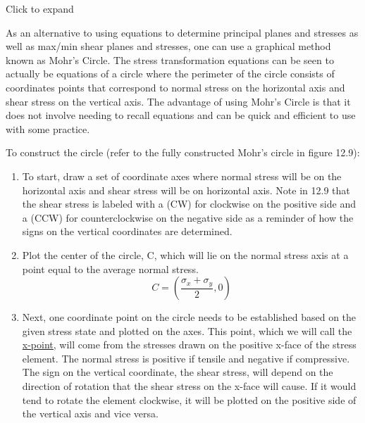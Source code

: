 \documentclass[
  letterpaper,
  DIV=11,
  numbers=noendperiod]{scrreprt}
\begin{document}
Click to expand

As an alternative to using equations to determine principal planes and
stresses as well as max/min shear planes and stresses, one can use a
graphical method known as Mohr's Circle. The stress transformation
equations can be seen to actually be equations of a circle where the
perimeter of the circle consists of coordinates points that correspond
to normal stress on the horizontal axis and shear stress on the vertical
axis. The advantage of using Mohr's Circle is that it does not involve
needing to recall equations and can be quick and efficient to use with
some practice.

To construct the circle (refer to the fully constructed Mohr's circle in
figure 12.9):

\begin{enumerate}
\def\labelenumi{\arabic{enumi}.}
\item
  To start, draw a set of coordinate axes where normal stress will be on
  the horizontal axis and shear stress will be on horizontal axis. Note
  in 12.9 that the shear stress is labeled with a (CW) for clockwise on
  the positive side and a (CCW) for counterclockwise on the negative
  side as a reminder of how the signs on the vertical coordinates are
  determined.
\item
  Plot the center of the circle, C, which will lie on the normal stress
  axis at a point equal to the average normal stress.\\
  \[
  C=\left(\frac{\sigma_x+\sigma_y}{2}, 0\right)
  \]
\item
  Next, one coordinate point on the circle needs to be established based
  on the given stress state and plotted on the axes. This point, which
  we will call the \ul{x-point,} will come from the stresses drawn on
  the positive x-face of the stress element. The normal stress is
  positive if tensile and negative if compressive. The sign on the
  vertical coordinate, the shear stress, will depend on the direction of
  rotation that the shear stress on the x-face will cause. If it would
  tend to rotate the element clockwise, it will be plotted on the
  positive side of the vertical axis and vice versa.


\end{enumerate}
\end{document}
